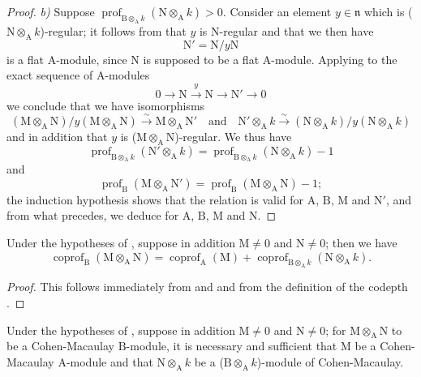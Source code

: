\begin{proof}
\emph{b)} Suppose $\operatorname{prof}_{\mathrm{B}\otimes_\mathrm{A} k}(\mathrm{N}\otimes_\mathrm{A} k)>0$.
Consider an element $y\in\mathfrak{n}$ which is ($\mathrm{N}\otimes_\mathrm{A} k$)-regular; it follows from  that $y$ is N-regular and that we then have
\[
  \mathrm{N}'=\mathrm{N}/y\mathrm{N}
\]
is a flat $\mathrm{A}$-module, since $\mathrm{N}$ is supposed to be a flat $\mathrm{A}$-module.
Applying  to the exact sequence of $\mathrm{A}$-modules
\[
  0\to\mathrm{N}\xrightarrow{y}\mathrm{N}\to\mathrm{N}'\to 0
\]
we conclude that we have isomorphisms
\[
  (\mathrm{M}\otimes_\mathrm{A}\mathrm{N})/y(\mathrm{M}\otimes_\mathrm{A}\mathrm{N})\xrightarrow{\sim}\mathrm{M}\otimes_\mathrm{A}\mathrm{N}' \quad\text{and}\quad \mathrm{N}'\otimes_\mathrm{A} k\xrightarrow{\sim}(\mathrm{N}\otimes_\mathrm{A} k)/y(\mathrm{N}\otimes_\mathrm{A} k)
\]
and in addition that $y$ is ($\mathrm{M}\otimes_\mathrm{A}\mathrm{N}$)-regular.
We thus have
\[
  \operatorname{prof}_{\mathrm{B}\otimes_\mathrm{A} k}(\mathrm{N}'\otimes_\mathrm{A} k)=\operatorname{prof}_{\mathrm{B}\otimes_\mathrm{A} k}(\mathrm{N}\otimes_\mathrm{A} k)-1
\]
and
\[
  \operatorname{prof}_\mathrm{B}(\mathrm{M}\otimes_\mathrm{A}\mathrm{N}')=\operatorname{prof}_\mathrm{B}(\mathrm{M}\otimes_\mathrm{A}\mathrm{N})-1;
\]
the induction hypothesis shows that the relation  is valid for $\mathrm{A}$, $\mathrm{B}$, $\mathrm{M}$ and $\mathrm{N}'$, and from what precedes, we deduce  for $\mathrm{A}$, $\mathrm{B}$, $\mathrm{M}$ and $\mathrm{N}$.
\end{proof}

\begin{corollary}[6.3.2]
\label{IV.6.3.2}
Under the hypotheses of , suppose in addition $\mathrm{M}\neq 0$ and $\mathrm{N}\neq 0$; then we have
\begin{equation}
  \operatorname{coprof}_\mathrm{B}(\mathrm{M}\otimes_\mathrm{A}\mathrm{N})=\operatorname{coprof}_\mathrm{A}(\mathrm{M})+\operatorname{coprof}_{\mathrm{B}\otimes_\mathrm{A} k}(\mathrm{N}\otimes_\mathrm{A} k).
  \tag{6.3.2.1}
\end{equation}
\end{corollary}

\begin{proof}
This follows immediately from  and  and from the definition of the codepth .
\end{proof}

\begin{corollary}[6.3.3]
\label{IV.6.3.3}
Under the hypotheses of , suppose in addition $\mathrm{M}\neq 0$ and $\mathrm{N}\neq 0$; for $\mathrm{M}\otimes_\mathrm{A}\mathrm{N}$ to be a Cohen-Macaulay $\mathrm{B}$-module, it is necessary and sufficient that $\mathrm{M}$ be a Cohen-Macaulay $\mathrm{A}$-module and that $\mathrm{N}\otimes_\mathrm{A} k$ be a ($\mathrm{B}\otimes_\mathrm{A} k$)-module of Cohen-Macaulay.
\end{corollary}

